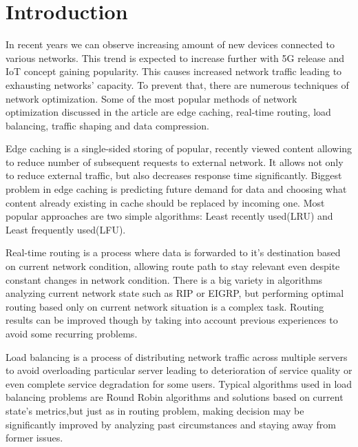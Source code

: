 \documentclass[conference]{IEEEtran}
\begin{document}
\section{Introduction}
In recent years we can observe increasing amount of new devices connected to various networks. This trend is expected to increase further with 5G release and IoT concept gaining popularity. This causes increased network traffic leading to exhausting networks' capacity. To prevent that, there are numerous techniques of network optimization. Some of the most popular methods of network optimization discussed in the article are edge caching, real-time routing, load balancing, traffic shaping and data compression. \par
Edge caching is a single-sided storing of popular, recently viewed content allowing to reduce number of subsequent requests to external network. It allows not only to reduce external traffic, but also decreases response time significantly. Biggest problem in edge caching is predicting future demand for data and choosing what content already existing in cache should be replaced by incoming one. Most popular approaches are two simple algorithms: Least recently used(LRU) and Least frequently used(LFU)\cite{cache1}\cite{cache2}.  \par
Real-time routing is a process where data is forwarded to it's destination based on current network condition, allowing route path to stay relevant even despite constant changes in network condition. There is a big variety in algorithms analyzing current network state such as RIP or EIGRP, but performing optimal routing based only on current network situation is a complex task. Routing results can be improved though by taking into account previous experiences to avoid some recurring problems\cite{routing1}\cite{routing2}.  \par
Load balancing is a process of distributing network traffic across multiple servers to avoid overloading particular server leading to deterioration of service quality or even complete service degradation for some users. Typical algorithms used in load balancing problems are Round Robin algorithms and solutions based on current state's metrics,but just as in routing problem, making decision may be significantly improved by analyzing past circumstances and staying away from former issues\cite{loadbalancing1}\cite{loadbalancing2}. \par
\end{document}
